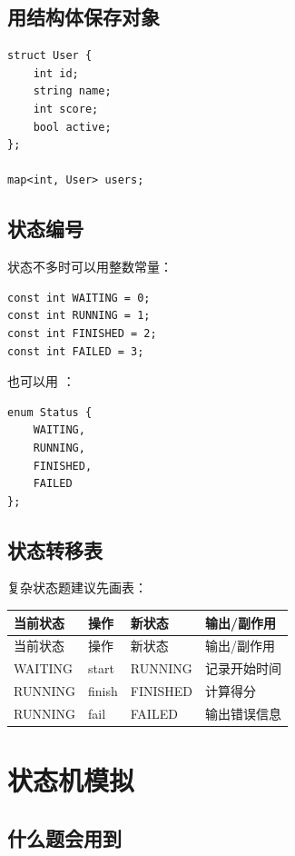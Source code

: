 \subsection{用结构体保存对象}

\begin{lstlisting}
struct User {
    int id;
    string name;
    int score;
    bool active;
};

map<int, User> users;
\end{lstlisting}

\subsection{状态编号}

状态不多时可以用整数常量：

\begin{lstlisting}
const int WAITING = 0;
const int RUNNING = 1;
const int FINISHED = 2;
const int FAILED = 3;
\end{lstlisting}

也可以用 ：

\begin{lstlisting}
enum Status {
    WAITING,
    RUNNING,
    FINISHED,
    FAILED
};
\end{lstlisting}

\subsection{状态转移表}

复杂状态题建议先画表：

\begin{longtable}{p{3cm}p{3cm}p{4cm}p{4cm}}
\toprule
当前状态 & 操作 & 新状态 & 输出/副作用 \\
\midrule
\endfirsthead
\toprule
当前状态 & 操作 & 新状态 & 输出/副作用 \\
\midrule
\endhead
WAITING & start & RUNNING & 记录开始时间 \\
RUNNING & finish & FINISHED & 计算得分 \\
RUNNING & fail & FAILED & 输出错误信息 \\
\bottomrule
\end{longtable}

\section{状态机模拟}\label{sec:07-13}

\subsection{什么题会用到}

